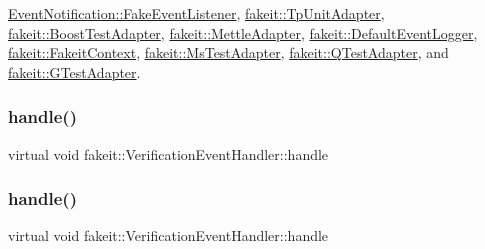\mbox{\hyperlink{classEventNotification_1_1FakeEventListener_a8d17ab08974befa7c652ef6a672f472a}{Event\+Notification\+::\+Fake\+Event\+Listener}}, \mbox{\hyperlink{classfakeit_1_1TpUnitAdapter_a9cdbf4f7a4a277d5b49740929fd8d2c7}{fakeit\+::\+Tp\+Unit\+Adapter}}, \mbox{\hyperlink{structfakeit_1_1BoostTestAdapter_a8c5e79f154223dce9fa9cbabd1bb3242}{fakeit\+::\+Boost\+Test\+Adapter}}, \mbox{\hyperlink{structfakeit_1_1MettleAdapter_a4abbacb12107084c5382975044282afe}{fakeit\+::\+Mettle\+Adapter}}, \mbox{\hyperlink{structfakeit_1_1DefaultEventLogger_a4bbb520dfe6bf042d7f0380e7b400bce}{fakeit\+::\+Default\+Event\+Logger}}, \mbox{\hyperlink{structfakeit_1_1FakeitContext_ac39067234f37a88f6c19440df0bc1b32}{fakeit\+::\+Fakeit\+Context}}, \mbox{\hyperlink{classfakeit_1_1MsTestAdapter_acee4f347e97ef8b0fa1ed66fe8b2841a}{fakeit\+::\+Ms\+Test\+Adapter}}, \mbox{\hyperlink{classfakeit_1_1QTestAdapter_a73e77ade8e08ed69ee1f510d21de4d4e}{fakeit\+::\+Q\+Test\+Adapter}}, and \mbox{\hyperlink{structfakeit_1_1GTestAdapter_a68bb18a833f63973f09d12597deb1cf7}{fakeit\+::\+G\+Test\+Adapter}}.

\mbox{\label{structfakeit_1_1EventHandler_adf355a9888bc2bf78ce0e1219bfb1379}} 
\subsubsection{\texorpdfstring{handle()}{handle()}\hspace{0.1cm}{\footnotesize\ttfamily [20/171]}}
{\footnotesize\ttfamily virtual void fakeit\+::\+Verification\+Event\+Handler\+::handle}

\mbox{\label{structfakeit_1_1EventHandler_a826b9d15e23bad7013b219d8e45ef1d0}} 
\subsubsection{\texorpdfstring{handle()}{handle()}\hspace{0.1cm}{\footnotesize\ttfamily [21/171]}}
{\footnotesize\ttfamily virtual void fakeit\+::\+Verification\+Event\+Handler\+::handle}

\mbox{\label{structfakeit_1_1EventHandler_a826b9d15e23bad7013b219d8e45ef1d0}} 
